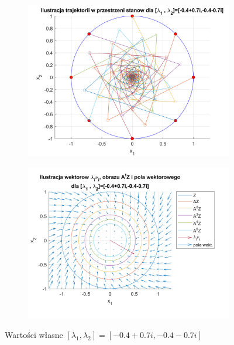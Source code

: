 \documentclass{article}
\begin{document}
\begin{figure}[H]
    \centering
    \begin{subfigure}{0.44\textwidth}
        \includegraphics[width=\textwidth]{portret_fazowy_-4+7i_-4-7i.png}
    \end{subfigure}
    \begin{subfigure}{0.48\textwidth}
        \includegraphics[width=\textwidth]{pole_wektorowe_-4+7i_-4-7i.png}
    \end{subfigure}
    \caption{Warto\'sci własne $[ \lambda_1, \lambda_2 ]= [ -0.4+0.7i, -0.4-0.7i ]$}
    \label{fig::-47ii-4-7}
\end{figure}

 
\end{document}
